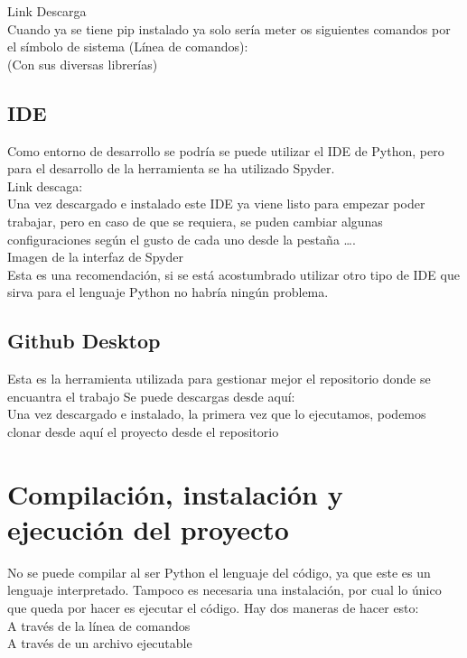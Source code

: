 Link Descarga\\

Cuando ya se tiene pip instalado ya solo sería meter os siguientes comandos por el símbolo de sistema (Línea de comandos):\\

 (Con sus diversas librerías)
\subsection{IDE}
Como entorno de desarrollo se podría se puede utilizar el IDE de Python, pero para el desarrollo de la herramienta se ha utilizado Spyder. \\
Link descaga:\\
Una vez descargado e instalado este IDE ya viene listo para empezar poder trabajar, pero en caso de que se requiera, se puden cambiar algunas configuraciones según el gusto de cada uno desde la pestaña ….\\
Imagen de la interfaz de Spyder\\
Esta es una recomendación, si se está acostumbrado utilizar otro tipo de IDE que sirva para el lenguaje Python no habría ningún problema.\\

\subsection{Github Desktop}

Esta es la herramienta utilizada para gestionar mejor el repositorio donde se encuantra el trabajo
Se puede descargas desde aquí:\\

Una vez descargado e instalado, la primera vez que lo ejecutamos, podemos clonar desde aquí el proyecto desde el repositorio

\section{Compilación, instalación y ejecución del proyecto}
No se puede compilar al ser Python el lenguaje del código, ya que este es un lenguaje interpretado. Tampoco es necesaria una instalación, por cual lo único que queda por hacer es ejecutar el código.
Hay dos maneras de hacer esto:\\

A través de la línea de comandos\\
A través de un archivo ejecutable\\

